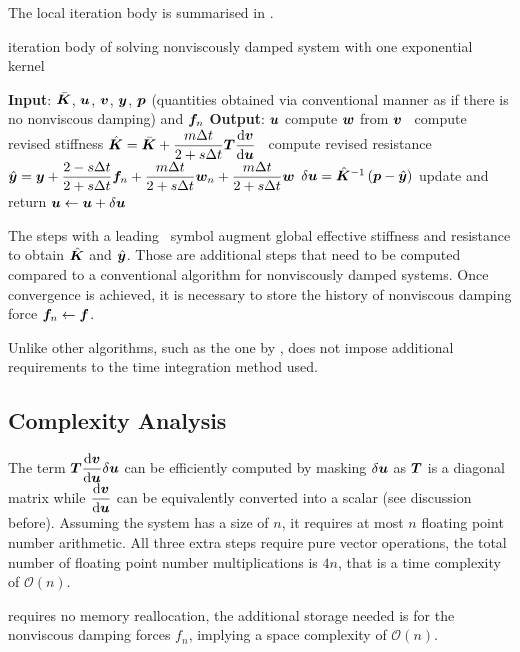 The local iteration body is summarised in .
\begin{breakablealgorithm}
\caption{iteration body of solving nonviscously damped system with one exponential kernel}\label{algo:single_model}
\begin{algorithmic}
\State \textbf{Input}: $\bar{\bm{K}}$, $\bm{u}$, $\bm{v}$, $\bm{y}$, $\bm{p}$ (quantities obtained via conventional manner as if there is no nonviscous damping) and $\bm{f}_n$
\State \textbf{Output}: $\bm{u}$
\State compute $\bm{w}$ from $\bm{v}$
\State \faMicrochip~compute revised stiffness $\hat{\bm{K}}=\bar{\bm{K}}+\dfrac{m\Delta{}t}{2+s\Delta{}t}\bm{T}\dfrac{\mathrm{d}\bm{v}}{\mathrm{d}\bm{u}}$
\State \faMicrochip~compute revised resistance $\hat{\bm{y}}=\bm{y}+\dfrac{2-s\Delta{}t}{2+s\Delta{}t}\bm{f}_n+\dfrac{m\Delta{}t}{2+s\Delta{}t}\bm{w}_n+\dfrac{m\Delta{}t}{2+s\Delta{}t}\bm{w}$
\State $\delta\bm{u}=\hat{\bm{K}}^{-1}\left(\bm{p}-\hat{\bm{y}}\right)$
\State update and return $\bm{u}\leftarrow\bm{u}+\delta\bm{u}$
\end{algorithmic}
\end{breakablealgorithm}
The steps with a leading \faMicrochip~symbol augment global effective stiffness and resistance to obtain $\hat{\bm{K}}$ and $\hat{\bm{y}}$. Those are additional steps that need to be computed compared to a conventional algorithm for nonviscously damped systems. Once convergence is achieved, it is necessary to store the history of nonviscous damping force $\bm{f}_n\leftarrow\bm{f}$.

Unlike other algorithms, such as the one by \citet{Cortes2009},  does not impose additional requirements to the time integration method used.
\subsection{Complexity Analysis}
The term $\bm{T}\dfrac{\mathrm{d}\bm{v}}{\mathrm{d}\bm{u}}\delta\bm{u}$ can be efficiently computed by masking $\delta\bm{u}$ as $\bm{T}$ is a diagonal matrix while $\dfrac{\mathrm{d}\bm{v}}{\mathrm{d}\bm{u}}$ can be equivalently converted into a scalar (see discussion before). Assuming the system has a size of $n$, it requires at most $n$ floating point number arithmetic. All three extra steps require pure vector operations, the total number of floating point number multiplications is $4n$, that is a time complexity of $\mathcal{O}\left(n\right)$.

 requires no memory reallocation, the additional storage needed is for the nonviscous damping forces $f_n$, implying a space complexity of $\mathcal{O}\left(n\right)$.
